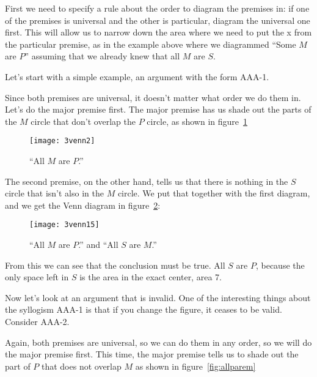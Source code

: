 First we need to specify a rule about the order to diagram the premises in: if one of the premises is universal and the other is particular, diagram the universal one first. This will allow us to narrow down the area where we need to put the x from the particular premise, as in the example above where we diagrammed ``Some $M$ are $P$'' assuming that we already knew that all $M$ are $S$.

Let's start with a simple example, an argument with the form AAA-1.

\begin{kormanize}
\end{kormanize}

Since both premises are universal, it doesn't matter what order we do them in. Let's do the major premise first. The major premise has us shade out the parts of the $M$ circle that don't overlap the $P$ circle, as shown in figure~\ref{fig:allmarep}

\begin{figure}[!ht]\centering
\texttt{[image: 3venn2]}
\caption{``All $M$ are $P$.''}
\label{fig:allmarep}
\end{figure}

The second premise, on the other hand, tells us that there is nothing in the $S$ circle that isn't also in the $M$ circle. We put that together with the first diagram, and we get the Venn diagram in figure~\ref{fig:vennvalidexample}:


\begin{figure}[!ht]\centering
\texttt{[image: 3venn15]}
\caption{``All $M$ are $P$.'' and ``All $S$ are $M$.''}
\label{fig:vennvalidexample}
\end{figure}


From this we can see that the conclusion must be true. All $S$ are $P$, because the only space left in $S$ is the area in the exact center, area 7.

Now let's look at an argument that is invalid. One of the interesting things about the syllogism AAA-1 is that if you change the figure, it ceases to be valid. Consider AAA-2.

\begin{kormanize}
\end{kormanize}

Again, both premises are universal, so we can do them in any order, so we will do the major premise first. This time, the major premise tells us to shade out the part of $P$ that does not overlap $M$ as shown in figure~\ref{fig:allparem}

